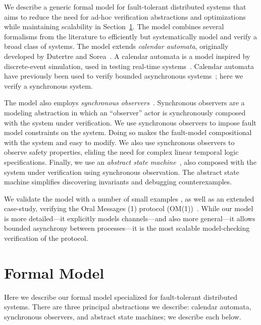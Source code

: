 \documentclass{IEEEtran/IEEEtran}
\newcommand{\lee}[1]{ } %
\newcommand{\lee}[1]{ {\color{blue}$<$lee: #1$>$} } %
\begin{document}
We describe a generic formal model for fault-tolerant distributed systems that aims to reduce the need for ad-hoc verification abstractions and optimizations while maintaining scalability in Section~\ref{sec:model}. The model combines several formalisms from the literature to efficiently but systematically model and verify a broad class of systems. The model extends \emph{calendar automata}, originally developed by Dutertre and Sorea~\cite{Dutertre-Sorea}. A calendar automata is a model inspired by discrete-event simulation, used in testing real-time systems~\cite{}.  Calendar automata have previously been used to verify bounded asynchronous systems~\cite{}; here we verify a synchronous system.

The model also employs \emph{synchronous observers}~\cite{}. Synchronous observers are a modeling abstraction in which an ``observer'' actor is synchronously composed with the system under verification. We use synchronous observers to impose fault model constraints on the system. Doing so makes the fault-model compositional with the system and easy to modify. We also use synchronous observers to observe safety properties, eliding the need for complex linear temporal logic specifications. Finally, we use an \emph{abstract state machine}~\cite{}, also composed with the system under verification using synchronous observation. The abstract state machine simplifies discovering invariants and debugging counterexamples.

We validate the model with a number of small examples \lee{todo}, as well as an extended case-study, verifying the Oral Messages (1) protocol (OM(1))~\cite{}. While our model is more detailed---it explicitly models channels---and also more general---it allows bounded asynchrony between processes---it is the most scalable model-checking verification of the protocol.

\lee{finish intro...  One more contribution is that we abstract faults using partially interpreted functions in model-checking, which is new? Note focus is on infinite-state model-checking}



\section{Formal Model}\label{sec:model}
Here we describe our formal model specialized for fault-tolerant distributed systems. There are three principal abstractions we describe: calendar automata, synchronous observers, and abstract state machines; we describe each below.
\end{document}
